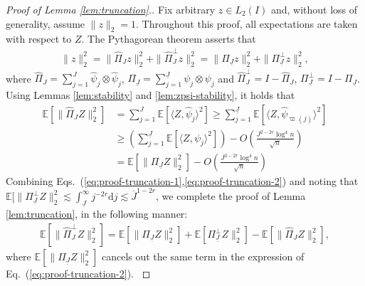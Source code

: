 \documentclass[11pt,a4paper]{article}
\renewcommand{\hat}{\widehat}
\renewcommand{\bar}{\overline}
\theoremstyle{definition}
\theoremstyle{plain}
\theoremstyle{remark}
\newcommand{\ud}{\mathrm d}
\newcommand{\und}{\underline}
\newcommand{\pd}[1]{
	{ \color{blue} PD: #1}
}
\begin{document}
\begin{proof}[Proof of Lemma \ref{lem:truncation}.]
Fix arbitrary $z\in L_2(I)$ and, without loss of generality, assume $\|z\|_2=1$.
Throughout this proof, all expectations are taken with respect to $Z$.
The Pythagorean theorem asserts that
\begin{align}
\|z\|_2^2 = \|\hat\Pi_{J}z\|_2^2+\|\hat\Pi_{J}^\perp z\|_2^2 = \|\Pi_{\und J}z\|_2^2+\|\Pi_{\und J}^\perp z\|_2^2,
\label{eq:proof-truncation-1}
\end{align}
where $\hat\Pi_J=\sum_{j=1}^J\hat\psi_j\otimes\hat\psi_j$, $\Pi_{\und J}=\sum_{j=1}^{\und J}\psi_j\otimes\psi_j$ and $\hat\Pi_J^\perp=I-\hat\Pi_J$, $\Pi_{\und J}^\perp = I-\Pi_{\und J}$.
Using Lemmas \ref{lem:stability} and \ref{lem:zpsi-stability}, it holds that
\begin{align}
\mathbb E[\|\hat\Pi_J Z\|_2^2] &= \sum_{j=1}^J \mathbb E[\langle Z,\hat\psi_j\rangle^2] \geq \sum_{j=1}^{\und J}\mathbb E[\langle Z,\hat\psi_{\varpi(j)}\rangle^2]\nonumber\\
&\geq \left(\sum_{j=1}^{\und J}\mathbb E[\langle Z,\psi_j\rangle^2]\right) - O\left(\frac{J^{2-2r}\log^4 n}{\sqrt{n}}\right)\nonumber\\
&= \mathbb E[\|\Pi_{\und J} Z\|_2^2] -O\left(\frac{J^{2-2r}\log^4 n}{\sqrt{n}}\right) \label{eq:proof-truncation-2}
\end{align}
Combining Eqs.~(\ref{eq:proof-truncation-1},\ref{eq:proof-truncation-2}) and noting that $\mathbb E[\|\Pi_{\und J}^\perp Z\|_2^2 \lesssim \int_{\und J}^{\infty} j^{-2r}\ud j \lesssim \bar J^{1-2r}$, 
we complete the proof of Lemma \ref{lem:truncation}, in the following manner:
{\color{magenta}
\begin{align*}
\mathbb E[\|\hat\Pi_J^\perp Z\|_2^2] = \mathbb E[\|\Pi_{\und J} Z\|_2^2] + \mathbb E[\Pi_{\und J}^\perp Z\|_2^2] - \mathbb E[\|\hat\Pi_J Z\|_2^2],
\end{align*}
where $\mathbb E[\|\Pi_{\und J} Z\|_2^2]$ cancels out the same term in the expression of Eq.~(\ref{eq:proof-truncation-2}).
}
\end{proof}
\end{document}
